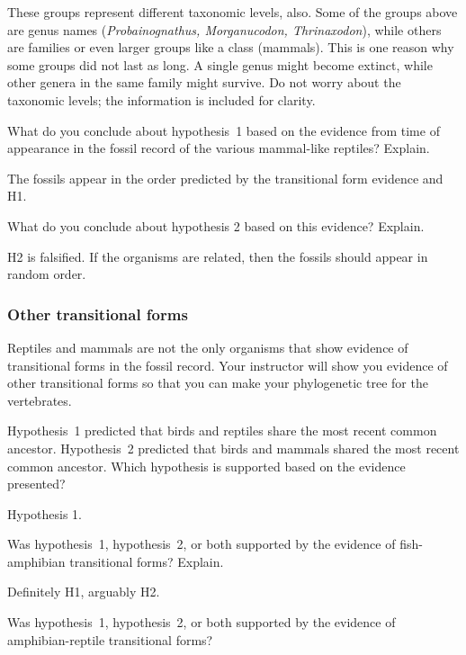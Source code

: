 \documentclass[12pt, hidelinks]{exam}
\newcommand*\AnswerBox[2]{%
    \parbox[t][#1]{0.92\textwidth}{%
    \begin{solution}#2\end{solution}}
    \vspace{\stretch{1}}
}
\begin{document}
\begin{questions}
These groups represent different taxonomic levels, also. Some of the
groups above are genus names (\emph{Probainognathus, Morganucodon,
Thrinaxodon}), while others are families or even larger groups like a class 
(mammals). This is one reason why some groups did not last as
long. A single genus might become extinct, while other genera in the
same family might survive. Do not worry about the taxonomic
levels; the information is included for clarity.

\question
What do you conclude about hypothesis~1 based on the
evidence from time of appearance in the fossil record of the various
mammal-like reptiles? Explain. 

\AnswerBox{2\baselineskip}{%
The fossils appear in the order predicted by the transitional form evidence and H1.
}

\question
What do you conclude about hypothesis 2 based on this
evidence? Explain.

\AnswerBox{2\baselineskip}{%
H2 is falsified. If the organisms are related, then the fossils should appear in random order.
}


\subsubsection*{Other transitional forms}

Reptiles and mammals are not the only organisms that show evidence of transitional forms in the fossil record. Your instructor will show you evidence of other transitional forms so that you can make your phylogenetic tree for the vertebrates. 

\question
Hypothesis~1 predicted that birds and reptiles share the most recent common ancestor. Hypothesis~2 predicted that birds and mammals shared the most recent common ancestor. Which hypothesis is supported based on the evidence presented?

\AnswerBox{2\baselineskip}{Hypothesis 1.}


\question
Was hypothesis~1, hypothesis~2, or both supported by the evidence of fish-amphibian transitional forms? Explain.

\AnswerBox{2\baselineskip}{Definitely H1, arguably H2.}

\question
Was hypothesis~1, hypothesis~2, or both supported by the evidence of amphibian-reptile transitional forms?


\end{questions}
\end{document}
